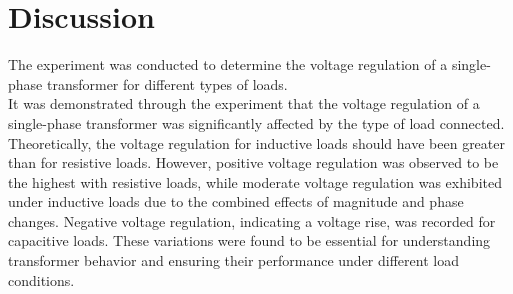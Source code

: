 \documentclass[a4paper,12pt]{article}
\begin{document}
	\section{Discussion}
	
	The experiment was conducted to determine the voltage regulation of a single-phase transformer for different types of loads.\\ It was demonstrated through the experiment that the voltage regulation of a single-phase transformer was significantly affected by the type of load connected. Theoretically, the voltage regulation for inductive loads should have been greater than for resistive loads. However, positive voltage regulation was observed to be the highest with resistive loads, while moderate voltage regulation was exhibited under inductive loads due to the combined effects of magnitude and phase changes. Negative voltage regulation, indicating a voltage rise, was recorded for capacitive loads. These variations were found to be essential for understanding transformer behavior and ensuring their performance under different load conditions.
	
	
\end{document}

